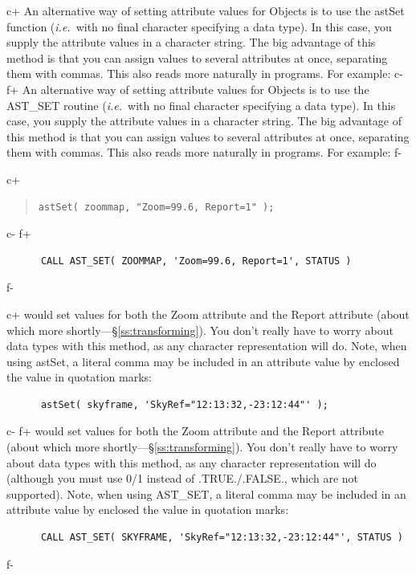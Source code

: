 \documentclass[twoside,11pt]{article}
\newcommand{\secref}[1]{\S\ref{#1}}
\newcommand{\secref}[1]{\ref{#1}}
\begin{document}
c+
An alternative way of setting attribute values for Objects is to use
the astSet function ({\em{i.e.}}\ with no final character specifying a
data type). In this case, you supply the attribute values in a
character string. The big advantage of this method is that you can
assign values to several attributes at once, separating them with
commas. This also reads more naturally in programs. For example:
c-
f+
An alternative way of setting attribute values for Objects is to use
the AST\_SET routine ({\em{i.e.}}\ with no final character specifying
a data type). In this case, you supply the attribute values in a
character string. The big advantage of this method is that you can
assign values to several attributes at once, separating them with
commas. This also reads more naturally in programs. For example:
f-

c+
\begin{quote}
\small
\begin{verbatim}
astSet( zoommap, "Zoom=99.6, Report=1" );
\end{verbatim}
\normalsize
\end{quote}
c-
f+
\small
\begin{verbatim}
      CALL AST_SET( ZOOMMAP, 'Zoom=99.6, Report=1', STATUS )
\end{verbatim}
\normalsize
f-

c+
would set values for both the Zoom attribute and the Report attribute
(about which more shortly---\secref{ss:transforming}). You don't really
have to worry about data types with this method, as any character
representation will do. Note, when using astSet, a
literal comma may be included in an attribute value by enclosed the value in
quotation marks:
\small
\begin{verbatim}
      astSet( skyframe, 'SkyRef="12:13:32,-23:12:44"' );
\end{verbatim}
\normalsize
c-
f+
would set values for both the Zoom attribute and the Report attribute
(about which more shortly---\secref{ss:transforming}). You don't really
have to worry about data types with this method, as any character
representation will do (although you must use 0/1 instead of
.TRUE./.FALSE., which are not supported). Note, when using AST\_SET, a
literal comma may be included in an attribute value by enclosed the value in
quotation marks:
\small
\begin{verbatim}
      CALL AST_SET( SKYFRAME, 'SkyRef="12:13:32,-23:12:44"', STATUS )
\end{verbatim}
\normalsize
f-
\end{document}
